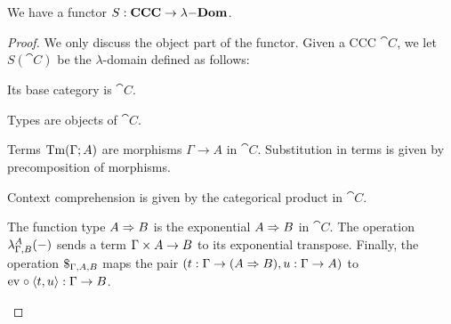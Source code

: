 \begin{prop} \label{prop:ccc-to-ldom}
We have a functor $S : \mathbf{CCC} \to \lambda\mathrm{-}\mathbf{Dom}$.
\begin{proof}
We only discuss the object part of the functor. Given a CCC $\cat{C}$, we let $S(\cat{C})$ be the $\lambda$-domain defined as follows:
\begin{enum}
    \item Its base category is $\cat{C}$.
    \item Types are objects of $\cat{C}$.
    \item Terms $\STm[\Gamma]{A}$ are morphisms $\Gamma \to A$ in $\cat{C}$. Substitution in terms is given by precomposition of morphisms.
    \item Context comprehension is given by the categorical product in $\cat{C}$.
    \item The function type $\Sfuncty{A}{B}$ is the exponential $A \Rightarrow B$ in $\cat{C}$. The operation $\Slam{A}[\Gamma,B]{-}$ sends a term $\Gamma \times A \to B$ to its exponential transpose. Finally, the operation $\Sapp[\Gamma,A,B]{}{}$ maps the pair $(t : \Gamma \to (A \Rightarrow B), u : \Gamma \to A)$ to $\mathrm{ev}_{} \circ \langle t, u \rangle : \Gamma \to B$. \qedhere
\end{enum}
\end{proof}
\end{prop}

